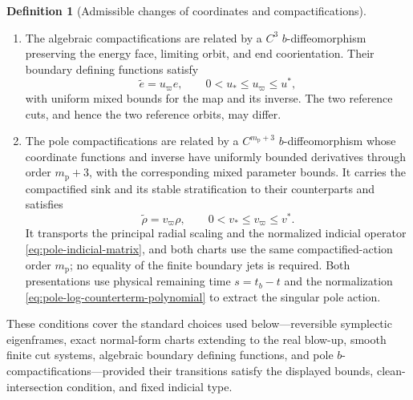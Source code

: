 \documentclass[11pt]{amsart}
\numberwithin{equation}{section}
\theoremstyle{definition}
\newtheorem{definition}[theorem]{Definition}
\theoremstyle{remark}
\begin{document}
\begin{definition}[Admissible changes of coordinates and compactifications]
\begin{enumerate}
On the compact parameter domains used for the residual-phase and
first-event maps, the two angular cuts and the pulled-back event faces form
a finite cleanly intersecting family, including at domain boundaries and
over $\mathcal P$.  The family admits parameter-uniform transverse collars
and $C^3$ local trivializations over a finite stratification of
$\mathcal P$; mixed derivatives on every total-space stratum extend
uniformly to its closure.  Thus cuts may cross return or first-exit
families, but infinite-order contact with a limiting face is excluded.

\item The algebraic compactifications are related by a $C^3$
$b$-diffeomorphism preserving the energy face, limiting orbit, and end
coorientation.  Their boundary defining functions satisfy
\begin{equation}\label{eq:compatible-algebraic-bdf}
 \widetilde e=u_\varpi e,\qquad
 0<u_*\le u_\varpi\le u^*,
\end{equation}
with uniform mixed bounds for the map and its inverse.  The two reference
cuts, and hence the two reference orbits, may differ.

\item The pole compactifications are related by a
$C^{m_{\mathrm p}+3}$
$b$-diffeomorphism whose coordinate functions and inverse have uniformly
bounded derivatives through order $m_{\mathrm p}+3$, with the
corresponding mixed parameter bounds.  It carries the compactified sink and its stable
stratification to their counterparts and satisfies
\begin{equation}\label{eq:compatible-pole-bdf}
 \widetilde\rho=v_\varpi\rho,\qquad
 0<v_*\le v_\varpi\le v^*.
\end{equation}
It transports the principal radial scaling and the normalized indicial
operator \eqref{eq:pole-indicial-matrix}, and both charts use the same
compactified-action order $m_{\mathrm p}$; no equality of the finite
boundary jets is required.  Both presentations use physical remaining
time $s=t_b-t$ and the normalization
\eqref{eq:pole-log-counterterm-polynomial} to extract the singular pole
action.
\end{enumerate}
These conditions cover the standard choices used below---reversible
symplectic eigenframes, exact normal-form charts extending to the real
blow-up, smooth finite cut systems, algebraic boundary defining functions,
and pole $b$-compactifications---provided their transitions satisfy the
displayed bounds, clean-intersection condition, and fixed indicial type.
\end{definition}
\end{document}
